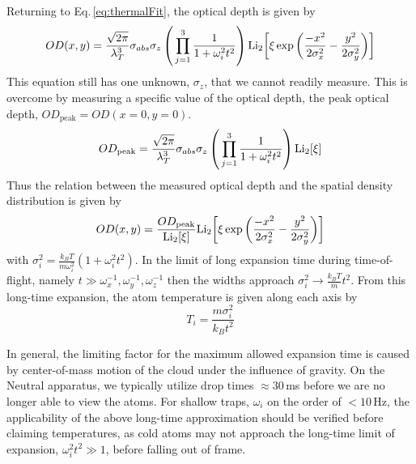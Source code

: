 \noindent Returning to Eq.\,\ref{eq:thermalFit}, the optical depth is given by
\begin{equation}
	OD(x,y) = \frac{\sqrt{2\pi}}{\lambda_T^3} \sigma_{abs} \sigma_z \left( \, \prod_{j=1}^3 \frac{1}{1+\omega_i^2t^2}\right)\text{Li}_{2}\!\left[ \xi\,\text{exp}\left( {\frac{-x^2}{2\sigma_x^2} - \frac{y^2}{2\sigma_y^2}} \right) \right]
\end{equation}
This equation still has one unknown, $\sigma_z$, that we cannot readily measure.
This is overcome by measuring a specific value of the optical depth, the peak optical depth, $OD_\text{peak}=OD(x=0,y=0)$.
\begin{equation}
	OD_{\text{peak}} = \frac{\sqrt{2\pi}}{\lambda_T^3} \sigma_{abs} \sigma_z \left( \, \prod_{j=1}^3 \frac{1}{1+\omega_i^2t^2}\right)\text{Li}_{2}\!\left[ \xi \right]
\end{equation}
Thus the relation between the measured optical depth and the spatial density distribution is given by
\begin{equation} \label{eq:OD}
	OD(x,y) = \frac{OD_{\text{peak}}}{\text{Li}_{2}\!\left[ \xi \right]}\text{Li}_{2}\!\left[ \xi\,\text{exp}\left( {\frac{-x^2}{2\sigma_x^2} - \frac{y^2}{2\sigma_y^2}} \right) \right]
\end{equation}
with $\sigma_i^2 = \frac{k_BT}{m\omega_i^2}(1+\omega_i^2t^2)$.
In the limit of long expansion time during time-of-flight, namely $t \gg \omega_x^{-1}, \omega_y^{-1}, \omega_z^{-1}$ then the widths approach $\sigma_i^2\rightarrow\frac{k_BT}{m}t^2$.
From this long-time expansion, the atom temperature is given along each axis by
\begin{equation}
	T_i=\frac{m \sigma_i^2}{k_Bt^2}
\end{equation}

In general, the limiting factor for the maximum allowed expansion time is caused by center-of-mass motion of the cloud under the influence of gravity. 
On the Neutral apparatus, we typically utilize drop times $\approx\!30$\,ms before we are no longer able to view the atoms.
For shallow traps, $\omega_i$ on the order of $<\!10$\,Hz, the applicability of the above long-time approximation should be verified before claiming temperatures, as cold atoms may not approach the long-time limit of expansion, $\omega_i^2t^2 \gg 1$, before falling out of frame.

